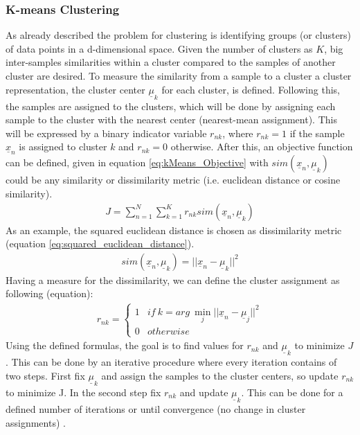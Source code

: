\documentclass[12pt,DIV14,BCOR12mm,a4paper,footexclude,headinclude,halfparskip-,twoside,openright,cleardoubleempty,idxtotoc,bibtotoc,listtotoc]{scrreprt} %
\numberwithin{equation}{chapter}
\begin{document}
\subsubsection{K-means Clustering}
As already described the problem for clustering is identifying groups (or clusters) of data points in a d-dimensional space. Given the number of clusters as $K$, big inter-samples similarities within a cluster compared to the samples of another cluster are desired. To measure the similarity from a sample to a cluster a cluster representation, the cluster center $\underline{\mu}_{k}$ for each cluster, is defined. Following this, the samples are assigned to the clusters, which will be done by assigning each sample to the cluster with the nearest center (nearest-mean assignment). This will be expressed by a binary indicator variable $r_{nk}$, where $r_{nk} = 1$ if the sample $\underline{x}_{n}$ is assigned to cluster $k$ and $r_{nk} = 0$ otherwise. After this, an objective function can be defined, given in equation \ref{eq:kMeans_Objective} with $sim(\underline{x}_{n}, \underline{\mu}_{k})$ could be any similarity or dissimilarity metric (i.e. euclidean distance or cosine similarity).
\begin{align}
J = \sum_{n=1}^{N} \sum_{k=1}^{K} r_{nk} sim(\underline{x}_{n}, \underline{\mu}_{k})\label{eq:kMeans_Objective}
\end{align}
As an example, the squared euclidean distance is chosen as dissimilarity metric (equation \ref{eq:squared_euclidean_distance}).
\begin{align}
sim(\underline{x}_{n}, \underline{\mu}_{k}) = ||\underline{x}_{n} - \underline{\mu}_{k}||^{2}\label{eq:squared_euclidean_distance}
\end{align}
Having a measure for the dissimilarity, we can define the cluster assignment as following (equation):
\begin{align}
r_{nk} = \begin{cases} 1 & if\ k = arg\ \underset{j}\min ||\underline{x}_{n} - \underline{\mu}_{j}||^{2}\\0 & otherwise\end{cases}\label{eq:sample_clusterassignment}
\end{align}
Using the defined formulas, the goal is to find values for $r_{nk}$ and $\underline{\mu}_{k}$ to minimize $J$. This can be done by an iterative procedure where every iteration contains of two steps. First fix $\underline{\mu}_{k}$ and assign the samples to the cluster centers, so update $r_{nk}$ to minimize J. In the second step fix $r_{nk}$ and update $\underline{\mu}_{k}$. This can be done for a defined number of iterations or until convergence (no change in cluster assignments) \cite{Bishop}.\\
\end{document}
